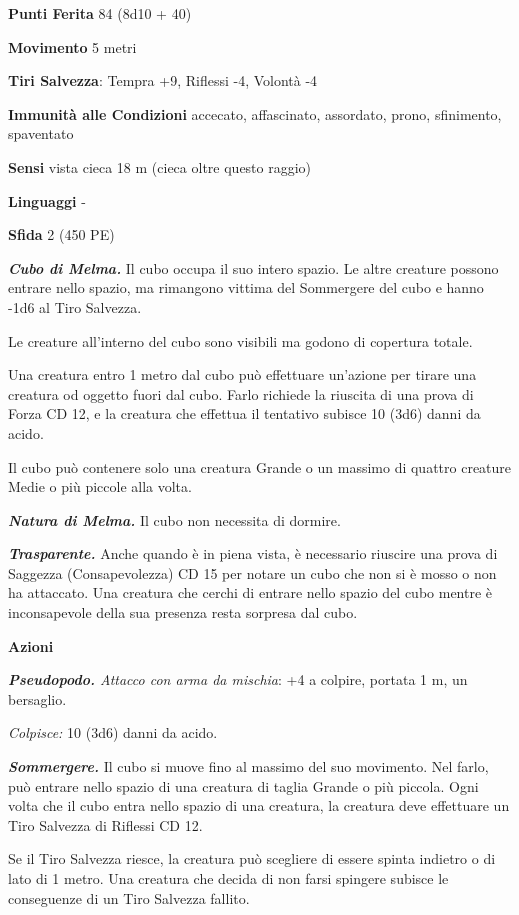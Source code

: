 \begin{multicols}{2}
\textbf{Punti Ferita} 84 (8d10 + 40)

\textbf{Movimento} 5 metri

\textbf{Tiri Salvezza}: Tempra +9, Riflessi -4, Volontà -4

\textbf{Immunità alle Condizioni} accecato, affascinato, assordato, prono, sfinimento, spaventato

\textbf{Sensi} vista cieca 18 m (cieca oltre questo raggio)

\textbf{Linguaggi} -

\textbf{Sfida} 2 (450 PE)

\emph{\textbf{Cubo di Melma.}} Il cubo occupa il suo intero spazio. Le altre creature possono entrare nello spazio, ma rimangono vittima del Sommergere del cubo e hanno -1d6 al Tiro Salvezza.

Le creature all'interno del cubo sono visibili ma godono di copertura totale.

Una creatura entro 1 metro dal cubo può effettuare un'azione per tirare una creatura od oggetto fuori dal cubo. Farlo richiede la riuscita di una prova di Forza CD 12, e la creatura che effettua il tentativo subisce 10 (3d6) danni da acido.

Il cubo può contenere solo una creatura Grande o un massimo di quattro creature Medie o più piccole alla volta.

\emph{\textbf{Natura di Melma.}} Il cubo non necessita di dormire.

\emph{\textbf{Trasparente.}} Anche quando è in piena vista, è necessario riuscire una prova di Saggezza (Consapevolezza) CD 15 per notare un cubo che non si è mosso o non ha attaccato. Una creatura che cerchi di entrare nello spazio del cubo mentre è inconsapevole della sua presenza resta sorpresa dal cubo.

\textbf{Azioni}

\emph{\textbf{Pseudopodo.} Attacco con arma da mischia}: +4 a colpire, portata 1 m, un bersaglio.

\emph{Colpisce:} 10 (3d6) danni da acido.

\emph{\textbf{Sommergere.}} Il cubo si muove fino al massimo del suo movimento. Nel farlo, può entrare nello spazio di una creatura di taglia Grande o più piccola. Ogni volta che il cubo entra nello spazio di una creatura, la creatura deve effettuare un Tiro Salvezza di Riflessi CD 12.

Se il Tiro Salvezza riesce, la creatura può scegliere di essere spinta indietro o di lato di 1 metro. Una creatura che decida di non farsi spingere subisce le conseguenze di un Tiro Salvezza fallito.


\end{multicols}
